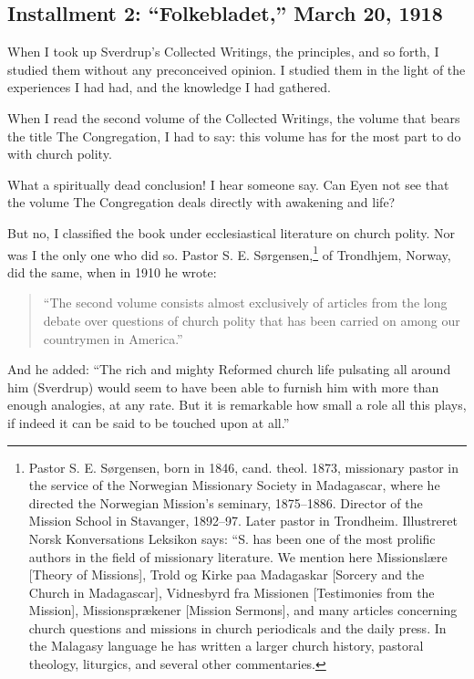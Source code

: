 
\subsection{Installment 2: “Folkebladet,” March 20, 1918}



When I took up Sverdrup’s Collected Writings, the principles, and so forth, I studied them without any preconceived opinion. I studied them in the light of the experiences I had had, and the knowledge I had gathered.

When I read the second volume of the Collected Writings, the volume that bears the title The Congregation, I had to say: this volume has for the most part to do with church polity.

What a spiritually dead conclusion! I hear someone say. Can Eyen not see that the volume The Congregation deals directly with awakening and life?

But no, I classified the book under ecclesiastical literature on church polity. Nor was I the only one who did so. Pastor S. E. Sørgensen,\footnote{Pastor S. E. Sørgensen, born in 1846, cand. theol. 1873, missionary pastor in the service of the Norwegian Missionary Society in Madagascar, where he directed the Norwegian Mission’s seminary, 1875–1886. Director of the Mission School in Stavanger, 1892–97. Later pastor in Trondheim. Illustreret Norsk Konversations Leksikon says: “S. has been one of the most prolific authors in the field of missionary literature. We mention here Missionslære [Theory of Missions], Trold og Kirke paa Madagaskar [Sorcery and the Church in Madagascar], Vidnesbyrd fra Missionen [Testimonies from the Mission], Missionsprækener [Mission Sermons], and many articles concerning church questions and missions in church periodicals and the daily press. In the Malagasy language he has written a larger church history, pastoral theology, liturgics, and several other commentaries.} of Trondhjem, Norway, did the same, when in 1910 he wrote:

\begin{quote}
“The second volume consists almost exclusively of articles from the long debate over questions of church polity that has been carried on among our countrymen in America.”
\end{quote}

And he added: “The rich and mighty Reformed church life pulsating all around him (Sverdrup) would seem to have been able to furnish him with more than enough analogies, at any rate. But it is remarkable how small a role all this plays, if indeed it can be said to be touched upon at all.”


